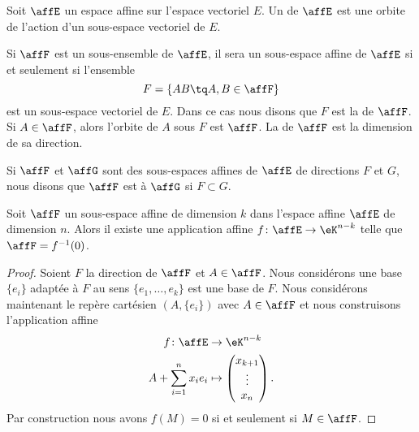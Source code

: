 \begin{definition}
    Soit \( \affE\) un espace affine sur l'espace vectoriel \( E\). Un  de \( \affE\) est une orbite de l'action d'un sous-espace vectoriel de \( E\).
\end{definition}

Si \( \affF\) est un sous-ensemble de \( \affE\), il sera un sous-espace affine de \( \affE\) si et seulement si l'ensemble
\begin{equation}
    F=\{ AB\tq A,B\in\affF \}
\end{equation}
est un sous-espace vectoriel de \( E\). Dans ce cas nous disons que \( F\) est la  de \( \affF\). Si \( A\in\affF\), alors l'orbite de \( A\) sous \( F\) est \( \affF\). La  de \( \affF\) est la dimension de sa direction.

Si \( \affF\) et \( \affG\) sont des sous-espaces affines de \( \affE\) de directions \( F\) et \( G\), nous disons que \( \affF\) est  à \( \affG\) si \( F\subset G\).

\begin{proposition}
    Soit \( \affF\) un sous-espace affine de dimension \( k\) dans l'espace affine \( \affE\) de dimension \( n\). Alors il existe une application affine \( f\colon \affE\to \eK^{n-k}\) telle que \( \affF=f^{-1}(0)\).
\end{proposition}

\begin{proof}
    Soient \( F\) la direction de \( \affF\) et \( A\in\affF\). Nous considérons une base \( \{ e_i \}\) adaptée à \( F\) au sens \( \{ e_1,\ldots, e_k \}\) est une base de \( F\). Nous considérons maintenant le repère cartésien \( (A,\{ e_i \})\) avec \( A\in\affF\) et nous construisons l'application affine
    \begin{equation}
        \begin{aligned}
            f\colon \affE&\to \eK^{n-k} \\
            A+\sum_{i=1}^nx_ie_i&\mapsto \begin{pmatrix}
                x_{k+1}    \\ 
                \vdots    \\ 
                x_n    
            \end{pmatrix}.
        \end{aligned}
    \end{equation}
    Par construction nous avons \( f(M)=0\) si et seulement si \( M\in\affF\).
\end{proof}

